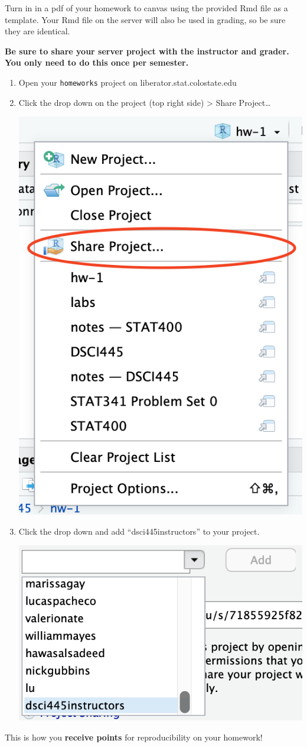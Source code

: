 \documentclass[
]{article}
\begin{document}
Turn in in a pdf of your homework to canvas using the provided Rmd file
as a template. Your Rmd file on the server will also be used in grading,
so be sure they are identical.

\textbf{Be sure to share your server project with the instructor and
grader. You only need to do this once per semester.}

\begin{enumerate}
\def\labelenumi{\arabic{enumi}.}
\item
  Open your \texttt{homeworks} project on liberator.stat.colostate.edu
\item
  Click the drop down on the project (top right side) \textgreater{}
  Share Project\ldots{}

  \includegraphics[width=0.25\linewidth]{share_project}
\item
  Click the drop down and add ``dsci445instructors'' to your project.

  \includegraphics[width=0.25\linewidth]{share_dropdown}
\end{enumerate}

This is how you \textbf{receive points} for reproducibility on your
homework!
\end{document}
